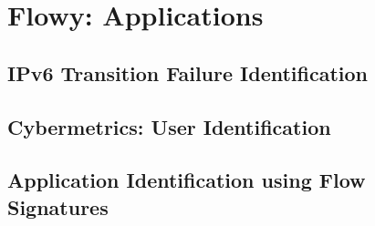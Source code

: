 \chapter{Flowy: Applications}\label{ch:flowy-applications}

\section{IPv6 Transition 
				 Failure Identification}\label{sec:application-signatures}
\section{Cybermetrics: User Identification}\label{sec:application-signatures}
\section{Application Identification using
 				 Flow Signatures}\label{sec:application-signatures}